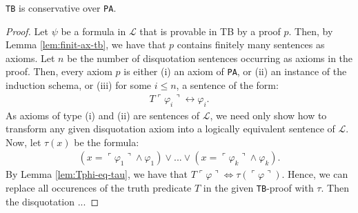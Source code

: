 \begin{theorem}
    \label{thm:tb-cons}
    \texttt{TB} is conservative over \texttt{PA}.
\end{theorem}

\begin{proof}  
Let $\psi$ be a formula in $\mathcal{L}$ that is provable in TB by a proof $p$. Then, by Lemma \ref{lem:finit-ax-tb}, we have that $p$ contains finitely many sentences as axioms. Let $n$ be the number of disquotation sentences occurring as axioms in the proof. Then, every axiom $p$ is either (i) an axiom of \texttt{PA}, or (ii) an instance of the induction schema, or (iii) for some $i \leq n$, a sentence of the form: 
\begin{align*}
    T\ulcorner \varphi_i \urcorner \leftrightarrow \varphi_i.
\end{align*}
As axioms of type (i) and (ii) are sentences of $\mathcal{L}$, we need only show how to transform any given disquotation axiom into a logically equivalent sentence of $\mathcal{L}$. Now, let $\tau(x)$ be the formula: 
\begin{align*}
    (x = \ulcorner \varphi_1 \urcorner \land \varphi_1) \lor ... \lor (x = \ulcorner \varphi_k \urcorner \land \varphi_k).
\end{align*}
By Lemma \ref{lem:Tphi-eq-tau}, we have that $T\ulcorner \varphi \urcorner \iff \tau(\ulcorner \varphi \urcorner)$. Hence, we can replace all occurences of the truth predicate $T$ in the given \texttt{TB}-proof with $\tau$. Then the disquotation ...
\end{proof}
    
